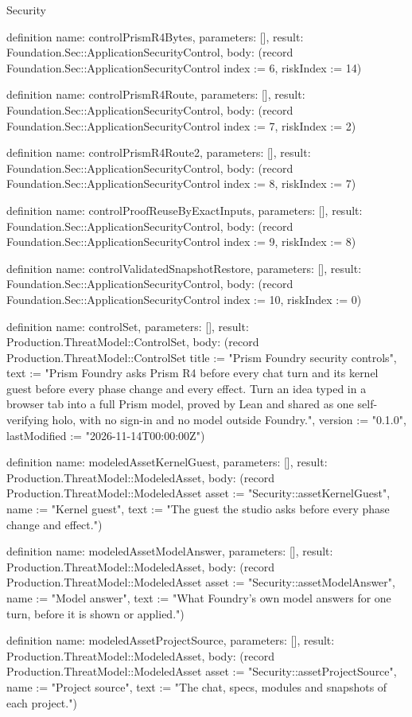\begin{lexlean}{Security}
\begin{semanticmodule}
definition{
  name: controlPrismR4Bytes,
  parameters: [],
  result: Foundation.Sec::ApplicationSecurityControl,
  body: (record Foundation.Sec::ApplicationSecurityControl {index := 6, riskIndex := 14})
}

definition{
  name: controlPrismR4Route,
  parameters: [],
  result: Foundation.Sec::ApplicationSecurityControl,
  body: (record Foundation.Sec::ApplicationSecurityControl {index := 7, riskIndex := 2})
}

definition{
  name: controlPrismR4Route2,
  parameters: [],
  result: Foundation.Sec::ApplicationSecurityControl,
  body: (record Foundation.Sec::ApplicationSecurityControl {index := 8, riskIndex := 7})
}

definition{
  name: controlProofReuseByExactInputs,
  parameters: [],
  result: Foundation.Sec::ApplicationSecurityControl,
  body: (record Foundation.Sec::ApplicationSecurityControl {index := 9, riskIndex := 8})
}

definition{
  name: controlValidatedSnapshotRestore,
  parameters: [],
  result: Foundation.Sec::ApplicationSecurityControl,
  body: (record Foundation.Sec::ApplicationSecurityControl {index := 10, riskIndex := 0})
}

definition{
  name: controlSet,
  parameters: [],
  result: Production.ThreatModel::ControlSet,
  body: (record Production.ThreatModel::ControlSet {title := "Prism Foundry security controls", text := "Prism Foundry asks Prism R4 before every chat turn and its kernel guest before every phase change and every effect. Turn an idea typed in a browser tab into a full Prism model, proved by Lean and shared as one self-verifying holo, with no sign-in and no model outside Foundry.", version := "0.1.0", lastModified := "2026-11-14T00:00:00Z"})
}

definition{
  name: modeledAssetKernelGuest,
  parameters: [],
  result: Production.ThreatModel::ModeledAsset,
  body: (record Production.ThreatModel::ModeledAsset {asset := "Security::assetKernelGuest", name := "Kernel guest", text := "The guest the studio asks before every phase change and effect."})
}

definition{
  name: modeledAssetModelAnswer,
  parameters: [],
  result: Production.ThreatModel::ModeledAsset,
  body: (record Production.ThreatModel::ModeledAsset {asset := "Security::assetModelAnswer", name := "Model answer", text := "What Foundry's own model answers for one turn, before it is shown or applied."})
}

definition{
  name: modeledAssetProjectSource,
  parameters: [],
  result: Production.ThreatModel::ModeledAsset,
  body: (record Production.ThreatModel::ModeledAsset {asset := "Security::assetProjectSource", name := "Project source", text := "The chat, specs, modules and snapshots of each project."})
}


\end{semanticmodule}
\end{lexlean}
